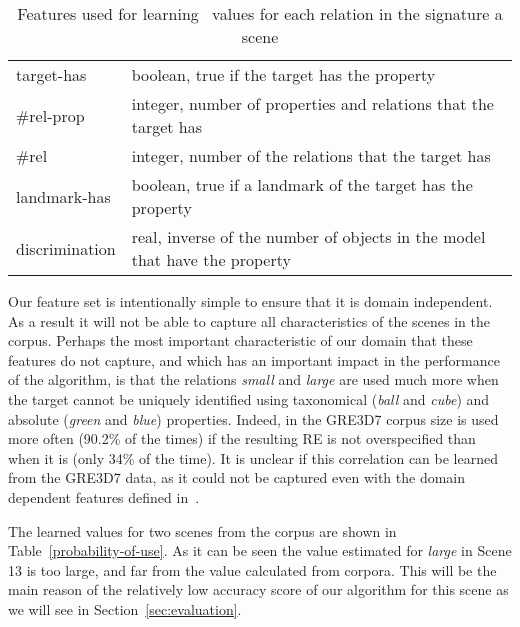 \begin{small}
\begin{table}[h!]
\begin{center}
\begin{tabular}{|l|p{10cm}|} 
\hline
\small target-has     & \small boolean, true if the target has the property \\
\small \#rel-prop     & \small integer, number of properties and relations that the target has\\
\small \#rel          & \small integer, number of the relations that the target has \\
\small landmark-has   & \small boolean, true if a landmark of the target has the property\\
\small discrimination & \small real,  inverse of the number of objects in the model that have the property \\
\hline
\end{tabular}
\caption{Features used for learning \puse\ values for each relation in the signature a scene}\label{features}
\end{center}
\end{table}
\end{small}

Our feature set is intentionally simple to ensure that it is domain independent. 
As a result it will not be able to capture all characteristics of the scenes in the corpus. 
Perhaps the most important characteristic of our domain that these features do not capture, 
and which has an important impact in the performance of the algorithm, is that the relations 
\emph{small} and \emph{large} are used much more when the target cannot be uniquely identified 
using taxonomical (\emph{ball} and \emph{cube}) and absolute (\emph{green} and \emph{blue}) properties. 
Indeed, in the GRE3D7 corpus size is used more often (90.2\% of the times) if the resulting 
RE is not overspecified than when it is (only 34\% of the time). It is unclear if this correlation 
can be learned from the GRE3D7 data, as it could not be captured even with the domain dependent 
features defined in~\cite[Chapter 6]{viet:gene11}. 

The learned values for two scenes from the corpus are shown in Table~\ref{probability-of-use}.  As it can be seen 
the value estimated for \emph{large} in Scene 13 is too large, and far from the value calculated from corpora. This
will be the main reason of the relatively low accuracy score of our algorithm for this scene as we will see in Section~\ref{sec:evaluation}. 

